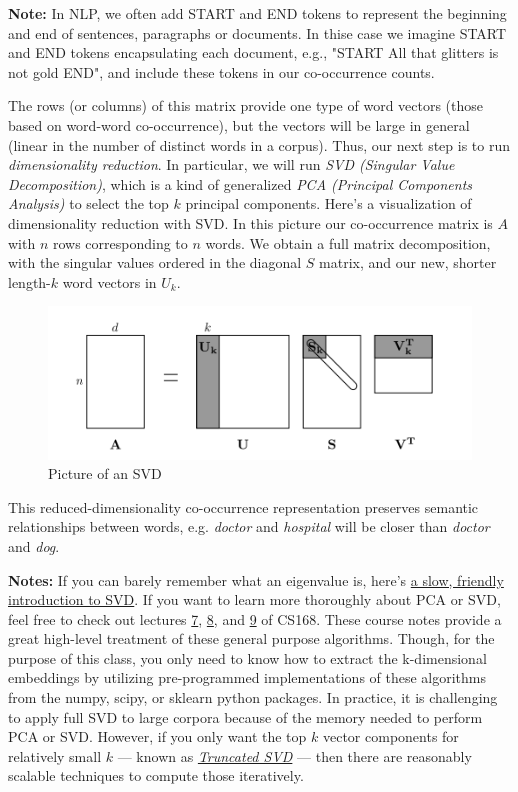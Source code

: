 \documentclass[11pt]{article}
\makeatletter
\def\maxwidth{\ifdim\Gin@nat@width>\linewidth\linewidth
    \else\Gin@nat@width\fi}
\let\Oldincludegraphics\includegraphics
\renewcommand{\includegraphics}[1]{\Oldincludegraphics[width=.8\maxwidth]{#1}}
\makeatother
\begin{document}
\textbf{Note:} In NLP, we often add START and END tokens to represent
the beginning and end of sentences, paragraphs or documents. In thise
case we imagine START and END tokens encapsulating each document, e.g.,
"START All that glitters is not gold END", and include these tokens in
our co-occurrence counts.

The rows (or columns) of this matrix provide one type of word vectors
(those based on word-word co-occurrence), but the vectors will be large
in general (linear in the number of distinct words in a corpus). Thus,
our next step is to run \emph{dimensionality reduction}. In particular,
we will run \emph{SVD (Singular Value Decomposition)}, which is a kind
of generalized \emph{PCA (Principal Components Analysis)} to select the
top \(k\) principal components. Here's a visualization of dimensionality
reduction with SVD. In this picture our co-occurrence matrix is \(A\)
with \(n\) rows corresponding to \(n\) words. We obtain a full matrix
decomposition, with the singular values ordered in the diagonal \(S\)
matrix, and our new, shorter length-\(k\) word vectors in \(U_k\).

\begin{figure}
\centering
\includegraphics{imgs/svd.png}
\caption{Picture of an SVD}
\end{figure}

This reduced-dimensionality co-occurrence representation preserves
semantic relationships between words, e.g. \emph{doctor} and
\emph{hospital} will be closer than \emph{doctor} and \emph{dog}.

\textbf{Notes:} If you can barely remember what an eigenvalue is, here's
\href{https://davetang.org/file/Singular_Value_Decomposition_Tutorial.pdf}{a
slow, friendly introduction to SVD}. If you want to learn more
thoroughly about PCA or SVD, feel free to check out lectures
\href{https://web.stanford.edu/class/cs168/l/l7.pdf}{7},
\href{http://theory.stanford.edu/~tim/s15/l/l8.pdf}{8}, and
\href{https://web.stanford.edu/class/cs168/l/l9.pdf}{9} of CS168. These
course notes provide a great high-level treatment of these general
purpose algorithms. Though, for the purpose of this class, you only need
to know how to extract the k-dimensional embeddings by utilizing
pre-programmed implementations of these algorithms from the numpy,
scipy, or sklearn python packages. In practice, it is challenging to
apply full SVD to large corpora because of the memory needed to perform
PCA or SVD. However, if you only want the top \(k\) vector components
for relatively small \(k\) --- known as
\emph{\href{https://en.wikipedia.org/wiki/Singular_value_decomposition\#Truncated_SVD}{Truncated
SVD}} --- then there are reasonably scalable techniques to compute those
iteratively.
\end{document}
